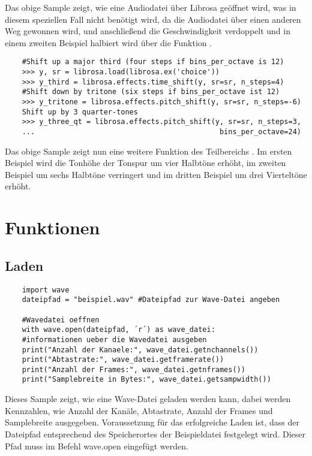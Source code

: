 Das obige Sample zeigt, wie eine Audiodatei über Librosa geöffnet wird, was in diesem speziellen Fall nicht benötigt wird, da die Audiodatei über einen anderen Weg gewonnen wird, und anschließend die Geschwindigkeit verdoppelt und in einem zweiten Beispiel halbiert wird über die Funktion .

\begin{verbatim}
    #Shift up a major third (four steps if bins_per_octave is 12)
    >>> y, sr = librosa.load(librosa.ex('choice'))
    >>> y_third = librosa.effects.time_shift(y, sr=sr, n_steps=4)
    #Shift down by tritone (six steps if bins_per_octave ist 12)
    >>> y_tritone = librosa.effects.pitch_shift(y, sr=sr, n_steps=-6)
    Shift up by 3 quarter-tones
    >>> y_three_qt = librosa.effects.pitch_shift(y, sr=sr, n_steps=3,
    ...                                           bins_per_octave=24)
\end{verbatim}

Das obige Sample zeigt nun eine weitere Funktion des Teilbereichs . 
Im ersten Beispiel wird die Tonhöhe der Tonspur um vier Halbtöne erhöht, im zweiten Beispiel um sechs Halbtöne verringert und im dritten Beispiel um drei Vierteltöne erhöht. \cite{McFee:2023}



\section{Funktionen}

\subsection{Laden}

\begin{verbatim}
    import wave
    dateipfad = "beispiel.wav" #Dateipfad zur Wave-Datei angeben
    
    #Wavedatei oeffnen
    with wave.open(dateipfad, ´r´) as wave_datei:
    #informationen ueber die Wavedatei ausgeben
    print("Anzahl der Kanaele:", wave_datei.getnchannels())
    print("Abtastrate:", wave_datei.getframerate())
    print("Anzahl der Frames:", wave_datei.getnframes())
    print("Samplebreite in Bytes:", wave_datei.getsampwidth())
\end{verbatim}


Dieses Sample zeigt, wie eine Wave-Datei geladen werden kann, dabei werden Kennzahlen, wie Anzahl der Kanäle, Abtastrate, Anzahl der Frames und Samplebreite ausgegeben. Voraussetzung für das erfolgreiche Laden ist, dass der Dateipfad entsprechend des Speicherortes der Beispieldatei festgelegt wird. Dieser Pfad muss im Befehl wave.open eingefügt werden.

